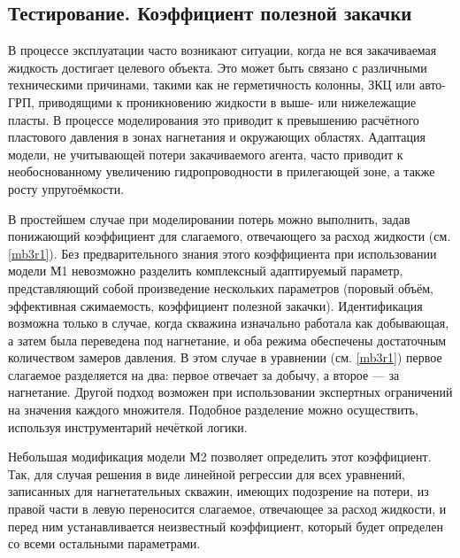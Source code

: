 \documentclass[14pt]{article}
\begin{document}
\newpage


\subsection{Тестирование. Коэффициент полезной закачки}
В процессе эксплуатации часто возникают ситуации, когда не вся закачиваемая жидкость достигает целевого объекта. Это может быть связано с различными техническими причинами, такими как не герметичность колонны, ЗКЦ или авто-ГРП, приводящими к проникновению жидкости в выше- или нижележащие пласты.
В процессе моделирования это приводит к превышению расчётного пластового давления в зонах нагнетания и окружающих областях. Адаптация модели, не учитывающей потери закачиваемого агента, часто приводит к необоснованному увеличению гидропроводности в прилегающей зоне, а также росту упругоёмкости.

В простейшем случае при моделировании потерь можно выполнить, задав понижающий коэффициент для слагаемого, отвечающего за расход жидкости (см. \ref{mb3r1}). Без предварительного знания этого коэффициента при использовании модели М1 невозможно разделить комплексный адаптируемый параметр, представляющий собой произведение нескольких параметров (поровый объём, эффективная сжимаемость, коэффициент полезной закачки). Идентификация возможна только в случае, когда скважина изначально работала как добывающая, а затем была переведена под нагнетание, и оба режима обеспечены достаточным количеством замеров давления. В этом случае в уравнении (см. \ref{mb3r1}) первое слагаемое разделяется на два: первое отвечает за добычу, а второе — за нагнетание.
Другой подход возможен при использовании экспертных ограничений на значения каждого множителя. Подобное разделение можно осуществить, используя инструментарий нечёткой логики.

Небольшая модификация модели М2 позволяет определить этот коэффициент. Так, для случая решения в виде линейной регрессии для всех уравнений, записанных для нагнетательных скважин, имеющих подозрение на потери, из правой части в левую переносится слагаемое, отвечающее за расход жидкости, и перед ним устанавливается неизвестный коэффициент, который будет определен со всеми остальными параметрами.
\end{document}
